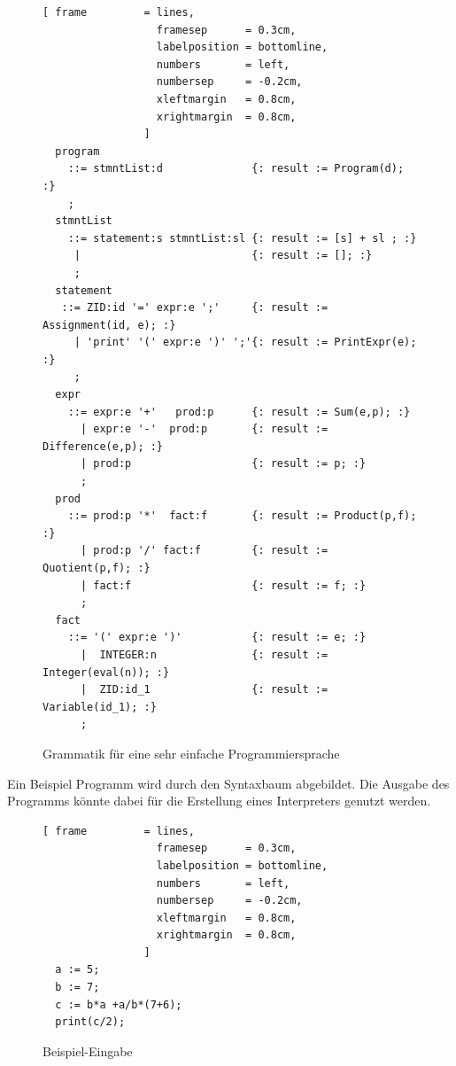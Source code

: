 \begin{figure}[!htb]

\begin{Verbatim}[ frame         = lines, 
                  framesep      = 0.3cm, 
                  labelposition = bottomline,
                  numbers       = left,
                  numbersep     = -0.2cm,
                  xleftmargin   = 0.8cm,
                  xrightmargin  = 0.8cm,
                ]
  program 
    ::= stmntList:d              {: result := Program(d); :}
    ;
  stmntList
    ::= statement:s stmntList:sl {: result := [s] + sl ; :}
     |                           {: result := []; :}
     ;
  statement 
   ::= ZID:id '=' expr:e ';'     {: result := Assignment(id, e); :}    
     | 'print' '(' expr:e ')' ';'{: result := PrintExpr(e); :}                                 
     ;
  expr 
    ::= expr:e '+'   prod:p      {: result := Sum(e,p); :} 
      | expr:e '-'  prod:p       {: result := Difference(e,p); :} 
      | prod:p                   {: result := p; :}
      ;
  prod 
    ::= prod:p '*'  fact:f       {: result := Product(p,f); :}
      | prod:p '/' fact:f        {: result := Quotient(p,f); :} 
      | fact:f                   {: result := f; :}
      ;
  fact 
    ::= '(' expr:e ')'           {: result := e; :} 
      |  INTEGER:n               {: result := Integer(eval(n)); :} 
      |  ZID:id_1                {: result := Variable(id_1); :}
      ;
\end{Verbatim}
\caption{Grammatik für eine sehr einfache Programmiersprache}
\label{fig:example_interpreter_grammar_statements}
\end{figure}
Ein Beispiel Programm  wird durch den Syntaxbaum  abgebildet.
Die Ausgabe des Programms könnte dabei für die Erstellung eines Interpreters genutzt werden.
\begin{figure}[!htb]

\begin{Verbatim}[ frame         = lines, 
                  framesep      = 0.3cm, 
                  labelposition = bottomline,
                  numbers       = left,
                  numbersep     = -0.2cm,
                  xleftmargin   = 0.8cm,
                  xrightmargin  = 0.8cm,
                ]
  a := 5;
  b := 7;
  c := b*a +a/b*(7+6);
  print(c/2);
\end{Verbatim}
\caption{Beispiel-Eingabe}
\label{fig:example_interpreter_input}
\end{figure}

